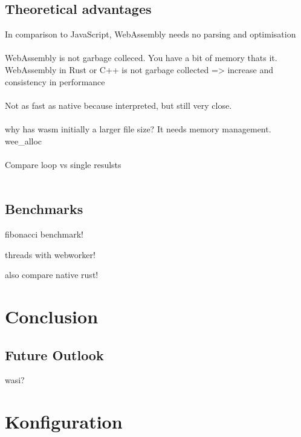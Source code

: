 \subsection{Theoretical advantages}
In comparison to JavaScript, WebAssembly needs no parsing and optimisation 
\\\\
WebAssembly is not garbage colleced. You have a bit of memory thats it.
WebAssembly in Rust or C++ is not garbage collected => increase and consistency in performance
\\\\
Not as fast as native because interpreted, but still very close.
\\\\
why has wasm initially a larger file size? It needs memory management. wee\_alloc \cite{wasm:allocator}
\\\\
Compare loop vs single resulsts
\\\\

\subsection{Benchmarks}
fibonacci benchmark!

threads with webworker!

also compare native rust!

\section{Conclusion}

\subsection{Future Outlook}
wasi?








\section{Konfiguration}
